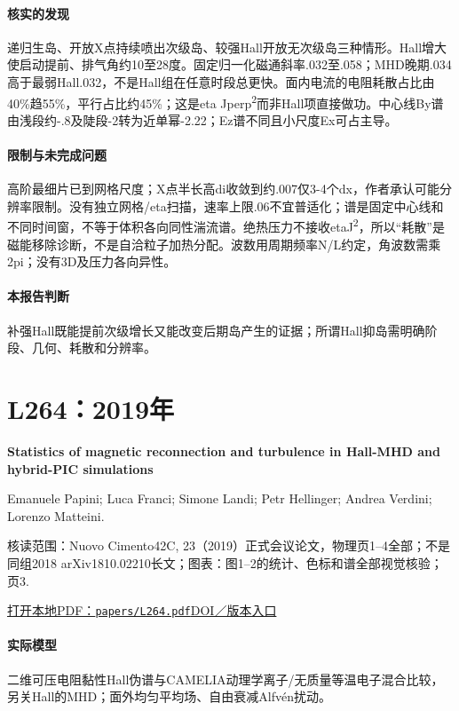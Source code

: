 \paragraph{核实的发现}递归生岛、开放X点持续喷出次级岛、较强Hall开放无次级岛三种情形。Hall增大使启动提前、排气角约10至28度。固定归一化磁通斜率.032至.058；MHD晚期.034高于最弱Hall.032，不是Hall组在任意时段总更快。面内电流的电阻耗散占比由40\%趋55\%，平行占比约45\%；这是eta Jperp\textsuperscript{2}而非Hall项直接做功。中心线By谱由浅段约-.8及陡段-2转为近单幂-2.22；Ez谱不同且小尺度Ex可占主导。

\paragraph{限制与未完成问题}高阶最细片已到网格尺度；X点半长高di收敛到约.007仅3-4个dx，作者承认可能分辨率限制。没有独立网格/eta扫描，速率上限.06不宜普适化；谱是固定中心线和不同时间窗，不等于体积各向同性湍流谱。绝热压力不接收etaJ\textsuperscript{2}，所以“耗散”是磁能移除诊断，不是自洽粒子加热分配。波数用周期频率N/L约定，角波数需乘2pi；没有3D及压力各向异性。

\paragraph{本报告判断}补强Hall既能提前次级增长又能改变后期岛产生的证据；所谓Hall抑岛需明确阶段、几何、耗散和分辨率。

\section{L264：2019年}\label{paper:L264}

\textbf{Statistics of magnetic reconnection and turbulence in Hall-MHD and hybrid-PIC simulations}\citep{L264}\

Emanuele Papini;  Luca Franci;  Simone Landi;  Petr Hellinger;  Andrea Verdini;  Lorenzo Matteini.

\textsf{核读范围：}Nuovo Cimento42C, 23（2019）正式会议论文，物理页1–4全部；不是同组2018 arXiv1810.02210长文；\textsf{图表：}图1–2的统计、色标和谱全部视觉核验；页3.

\href{run:papers/L264.pdf}{打开本地PDF：\texttt{papers/L264.pdf}}\quad\href{https://doi.org/10.1393/ncc/i2019-19023-0}{DOI／版本入口}

\paragraph{实际模型}二维可压电阻黏性Hall伪谱与CAMELIA动理学离子/无质量等温电子混合比较，另关Hall的MHD；面外均匀平均场、自由衰减Alfvén扰动。

